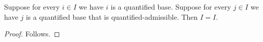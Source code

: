 

\begin{theorem}\label{quantified_phrase}
    Suppose for every $i\in I$ we have $i$ is a quantified base.
    Suppose for every $j\in I$ we have $j$ is a quantified base that is quantified-admissible.
    Then $I=I$.
\end{theorem}
\begin{proof}
    Follows.
\end{proof}
